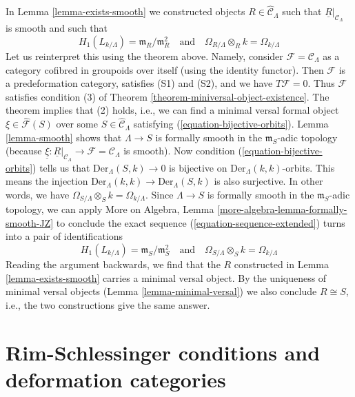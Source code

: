 \begin{example}
\label{example-smooth-continued}
In Lemma \ref{lemma-exists-smooth} we constructed objects
$R \in \widehat{\mathcal{C}}_\Lambda$ such that
$\underline{R}|_{\mathcal{C}_\Lambda}$ is smooth
and such that
$$
H_1(L_{k/\Lambda}) = \mathfrak m_R/\mathfrak m_R^2
\quad\text{and}\quad
\Omega_{R/\Lambda} \otimes_R k = \Omega_{k/\Lambda}
$$
Let us reinterpret this using the theorem above. Namely,
consider $\mathcal{F} = \mathcal{C}_\Lambda$
as a category cofibred in groupoids over itself
(using the identity functor).
Then $\mathcal{F}$ is a predeformation category,
satisfies (S1) and (S2), and we have $T\mathcal{F} = 0$.
Thus $\mathcal{F}$ satisfies condition (3) of
Theorem \ref{theorem-miniversal-object-existence}.
The theorem implies that (2) holds, i.e.,
we can find a minimal versal formal object
$\xi \in \widehat{\mathcal{F}}(S)$
over some $S \in \widehat{\mathcal{C}}_\Lambda$
satisfying (\ref{equation-bijective-orbits}).
Lemma \ref{lemma-smooth} shows that
$\Lambda \to S$ is formally smooth in the $\mathfrak m_S$-adic
topology (because
$\underline{\xi} : \underline{R}|_{\mathcal{C}_\Lambda} \to
\mathcal{F} = \mathcal{C}_\Lambda$ is smooth).
Now condition (\ref{equation-bijective-orbits})
tells us that $\text{Der}_\Lambda(S, k) \to 0$ is bijective on
$\text{Der}_\Lambda(k, k)$-orbits. This means the injection
$\text{Der}_\Lambda(k, k) \to \text{Der}_\Lambda(S, k)$ is also surjective.
In other words, we have
$\Omega_{S/\Lambda} \otimes_S k = \Omega_{k/\Lambda}$.
Since $\Lambda \to S$ is formally smooth in the $\mathfrak m_S$-adic
topology, we can apply More on Algebra, Lemma
\ref{more-algebra-lemma-formally-smooth-JZ}
to conclude the exact sequence (\ref{equation-sequence-extended})
turns into a pair of identifications
$$
H_1(L_{k/\Lambda}) = \mathfrak m_S/\mathfrak m_S^2
\quad\text{and}\quad
\Omega_{S/\Lambda} \otimes_S k = \Omega_{k/\Lambda}
$$
Reading the argument backwards, we find that the $R$ constructed
in Lemma \ref{lemma-exists-smooth} carries a minimal versal object.
By the uniqueness of minimal versal objects
(Lemma \ref{lemma-minimal-versal})
we also conclude $R \cong S$, i.e., the two constructions give
the same answer.
\end{example}







\section{Rim-Schlessinger conditions and deformation categories}
\label{section-RS-condition}

